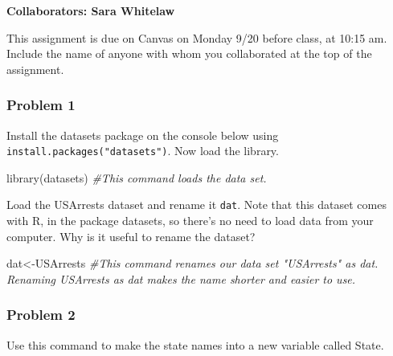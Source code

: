 \documentclass[
]{article}
\newenvironment{Shaded}{\begin{snugshade}}{\end{snugshade}}
\newcommand{\CommentTok}[1]{\textcolor[rgb]{0.56,0.35,0.01}{\textit{#1}}}
\newcommand{\FunctionTok}[1]{\textcolor[rgb]{0.00,0.00,0.00}{#1}}
\newcommand{\NormalTok}[1]{#1}
\newcommand{\OtherTok}[1]{\textcolor[rgb]{0.56,0.35,0.01}{#1}}
\newcommand{\SpecialCharTok}[1]{\textcolor[rgb]{0.00,0.00,0.00}{#1}}
\begin{document}
\textbf{Collaborators: Sara Whitelaw }

This assignment is due on Canvas on Monday 9/20 before class, at 10:15
am. Include the name of anyone with whom you collaborated at the top of
the assignment.

\hypertarget{problem-1}{%
\subsubsection{Problem 1}\label{problem-1}}

Install the datasets package on the console below using
\texttt{install.packages("datasets")}. Now load the library.

\begin{Shaded}
\begin{Highlighting}[]
\FunctionTok{library}\NormalTok{(datasets)}
\CommentTok{\#This command loads the data set. }
\end{Highlighting}
\end{Shaded}

Load the USArrests dataset and rename it \texttt{dat}. Note that this
dataset comes with R, in the package datasets, so there's no need to
load data from your computer. Why is it useful to rename the dataset?

\begin{Shaded}
\begin{Highlighting}[]
\NormalTok{dat}\OtherTok{\textless{}{-}}\NormalTok{USArrests}
\CommentTok{\#This command renames our data set "USArrests" as dat. Renaming USArrests as dat makes the name shorter and easier to use. }
\end{Highlighting}
\end{Shaded}

\hypertarget{problem-2}{%
\subsubsection{Problem 2}\label{problem-2}}

Use this command to make the state names into a new variable called
State.

\begin{Shaded}
\end{Shaded}
\end{document}

